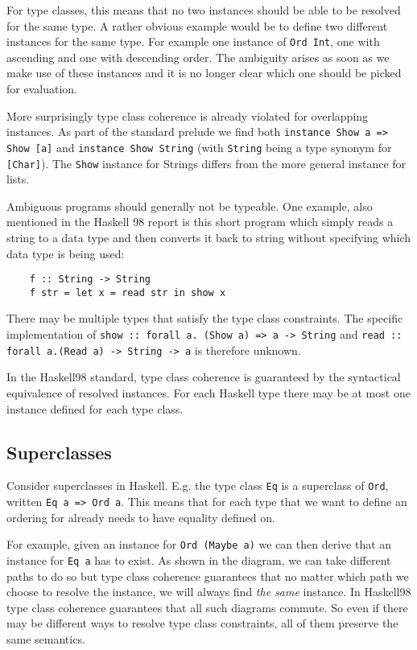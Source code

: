 For type classes, this means that no two instances should be able to be resolved for the same type.
A rather obvious example would be to define two different instances for the same type.
For example one instance of \texttt{Ord Int}, one with ascending and one with descending order.
The ambiguity arises as soon as we make use of these instances and it is no longer clear which one should be picked for evaluation.

More surprisingly type class coherence is already violated for overlapping instances.
As part of the standard prelude we find both \texttt{instance Show a => Show [a]} and \texttt{instance Show String}
(with \texttt{String} being a type synonym for \texttt{[Char]}).
The \texttt{Show} instance for Strings differs from the more general instance for lists.

Ambiguous programs should generally not be typeable.
One example, also mentioned in the Haskell 98 report \cite{Haskell98} is this short program which simply reads a string to a data type and then converts it back to string without specifying which data type is being used:

\begin{verbatim}
    f :: String -> String
    f str = let x = read str in show x
\end{verbatim}

There may be multiple types that satisfy the type class constraints.
The specific implementation of \texttt{show :: forall a. (Show a) => a -> String} and \texttt{read :: forall a.(Read a) -> String -> a} is therefore unknown.

In the Haskell98 standard, type class coherence is guaranteed by the syntactical equivalence of resolved instances.
For each Haskell type there may be at most one instance defined for each type class.


\subsection{Superclasses}

Consider superclasses in Haskell.
E.g. the type class \texttt{Eq} is a superclass of \texttt{Ord}, written \texttt{Eq a => Ord a}.
This means that for each type that we want to define an ordering for already needs to have equality defined on.

For example, given an instance for \texttt{Ord (Maybe a)} we can then derive that an instance for \texttt{Eq a} has to exist.
As shown in the diagram, we can take different paths to do so but type class coherence guarantees that no matter which path we choose to resolve the instance, we will always find \emph{the same} instance.
In Haskell98 type class coherence guarantees that all such diagrams commute.
So even if there may be different ways to resolve type class constraints, all of them preserve the same semantics.

